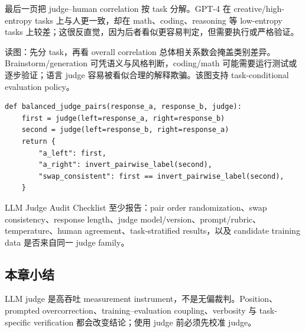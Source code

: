 最后一页把 judge--human correlation 按 task 分解。GPT-4 在 creative/high-entropy tasks 上与人更一致，却在 math、coding、reasoning 等 low-entropy tasks 上较差；这很反直觉，因为后者看似更容易判定，但需要执行或严格验证。


\begin{knowledgebox}{读图：先分 task，再看 overall correlation}
总体相关系数会掩盖类别差异。Brainstorm/generation 可凭语义与风格判断，coding/math 可能需要运行测试或逐步验证；语言 judge 容易被看似合理的解释欺骗。该图支持 task-conditional evaluation policy。
\end{knowledgebox}


\begin{lstlisting}[caption={Counterbalanced pairwise LLM-judge evaluation 的概念实现}]
def balanced_judge_pairs(response_a, response_b, judge):
    first = judge(left=response_a, right=response_b)
    second = judge(left=response_b, right=response_a)
    return {
        "a_left": first,
        "a_right": invert_pairwise_label(second),
        "swap_consistent": first == invert_pairwise_label(second),
    }
\end{lstlisting}

\begin{importantbox}{LLM Judge Audit Checklist}
至少报告：pair order randomization、swap consistency、response length、judge model/version、prompt/rubric、temperature、human agreement、task-stratified results，以及 candidate training data 是否来自同一 judge family。
\end{importantbox}

\subsection{本章小结}

LLM judge 是高吞吐 measurement instrument，不是无偏裁判。Position、prompted overcorrection、training--evaluation coupling、verbosity 与 task-specific verification 都会改变结论；使用 judge 前必须先校准 judge。

